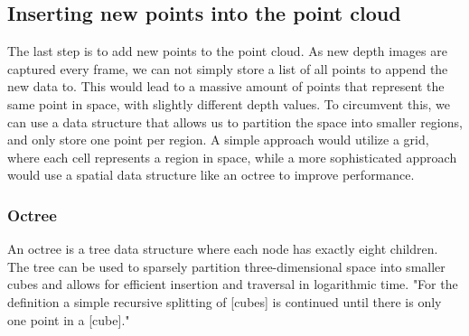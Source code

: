 

\subsection{Inserting new points into the point cloud}

The last step is to add new points to the point cloud.
As new depth images are captured every frame, we can not simply store a list of all points to append the new data to.
This would lead to a massive amount of points that represent the same point in space, with slightly different depth values.
To circumvent this, we can use a data structure that allows us to partition the space into smaller regions, and only store one point per region.
A simple approach would utilize a grid, where each cell represents a region in space, while a more sophisticated approach
would use a spatial data structure like an octree to improve performance.

\subsubsection{Octree}
An octree is a tree data structure where each node has exactly eight children.
The tree can be used to sparsely partition three-dimensional space into smaller cubes and allows for efficient
insertion and traversal in logarithmic time.
"For the definition a simple recursive splitting of [cubes] is continued until there is only one point in a [cube]."
\parencite{gabriel_zachmann_geometric_2002}

